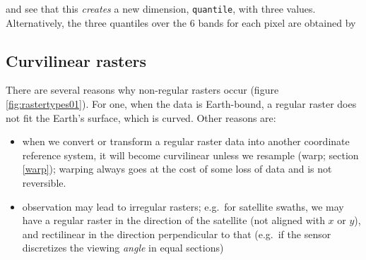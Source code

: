 \documentclass[]{book}
\newenvironment{Shaded}{\begin{snugshade}}{\end{snugshade}}
\newcommand{\CommentTok}[1]{\textcolor[rgb]{0.56,0.35,0.01}{\textit{#1}}}
\newcommand{\DecValTok}[1]{\textcolor[rgb]{0.00,0.00,0.81}{#1}}
\newcommand{\FloatTok}[1]{\textcolor[rgb]{0.00,0.00,0.81}{#1}}
\newcommand{\KeywordTok}[1]{\textcolor[rgb]{0.13,0.29,0.53}{\textbf{#1}}}
\newcommand{\NormalTok}[1]{#1}
\newcommand{\StringTok}[1]{\textcolor[rgb]{0.31,0.60,0.02}{#1}}
\providecommand{\tightlist}{%
  \setlength{\itemsep}{0pt}\setlength{\parskip}{0pt}}
\begin{document}
and see that this \emph{creates} a new dimension, \texttt{quantile}, with three values.
Alternatively, the three quantiles over the 6 bands for each pixel are
obtained by

\begin{Shaded}
\end{Shaded}

\hypertarget{curvilinear-rasters}{%
\subsection{Curvilinear rasters}\label{curvilinear-rasters}}

There are several reasons why non-regular rasters occur (figure
\ref{fig:rastertypes01}). For one, when the data is Earth-bound,
a regular raster does not fit the Earth's surface, which is
curved. Other reasons are:

\begin{itemize}
\tightlist
\item
  when we convert or transform a regular raster data into another
  coordinate reference system, it will become curvilinear unless we
  resample (warp; section \ref{warp}); warping always goes at the
  cost of some loss of data and is not reversible.
\item
  observation may lead to irregular rasters; e.g.~for satellite swaths, we
  may have a regular raster in the direction of the satellite (not
  aligned with \(x\) or \(y\)), and rectilinear in the direction perpendicular to that
  (e.g.~if the sensor discretizes the viewing \emph{angle} in equal sections)
\end{itemize}
\end{document}
